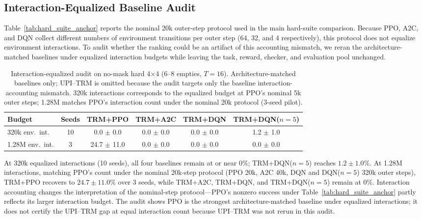 \documentclass{article}
\theoremstyle{plain}
\theoremstyle{definition}
\theoremstyle{remark}
\begin{document}
\subsection{Interaction-Equalized Baseline Audit}
\label{app:equalized_baselines}

Table~\ref{tab:hard_suite_anchor} reports the nominal 20k outer-step protocol used in the main hard-suite comparison. Because PPO, A2C, and DQN collect different numbers of environment transitions per outer step (64, 32, and 4 respectively), this protocol does not equalize environment interactions. To audit whether the ranking could be an artifact of this accounting mismatch, we reran the architecture-matched baselines under equalized interaction budgets while leaving the task, reward, checker, and evaluation pool unchanged.

\begin{table}[t]
\caption{Interaction-equalized audit on no-mask hard 4$\times$4 (6--8 empties, $T{=}16$). Architecture-matched baselines only; UPI--TRM is omitted because the audit targets only the baseline interaction-accounting mismatch. 320k interactions corresponds to the equalized budget at PPO's nominal 5k outer steps; 1.28M matches PPO's interaction count under the nominal 20k protocol (3-seed pilot).}
\label{tab:equalized_baselines}
\centering
\small
\begin{tabular}{@{}lccccc@{}}
\toprule
Budget & Seeds & TRM+PPO & TRM+A2C & TRM+DQN & TRM+DQN($n{=}5$) \\
\midrule
320k env.\ int. & 10 & 0.0 $\pm$ 0.0 & 0.0 $\pm$ 0.0 & 0.0 $\pm$ 0.0 & 1.2 $\pm$ 1.0 \\
1.28M env.\ int. & 3 & 24.7 $\pm$ 11.0 & 0.0 $\pm$ 0.0 & 0.0 $\pm$ 0.0 & 0.0 $\pm$ 0.0 \\
\bottomrule
\end{tabular}
\end{table}

At 320k equalized interactions (10 seeds), all four baselines remain at or near $0\%$; TRM+DQN($n{=}5$) reaches $1.2\pm 1.0\%$. At 1.28M interactions, matching PPO's count under the nominal 20k-step protocol (PPO 20k, A2C 40k, DQN and DQN($n{=}5$) 320k outer steps), TRM+PPO recovers to $24.7\pm 11.0\%$ over 3 seeds, while TRM+A2C, TRM+DQN, and TRM+DQN($n{=}5$) remain at $0\%$. Interaction accounting changes the interpretation of the nominal-step protocol---PPO's nonzero success under Table~\ref{tab:hard_suite_anchor} partly reflects its larger interaction budget. The audit shows PPO is the strongest architecture-matched baseline under equalized interactions; it does not certify the UPI--TRM gap at equal interaction count because UPI--TRM was not rerun in this audit.
\end{document}
